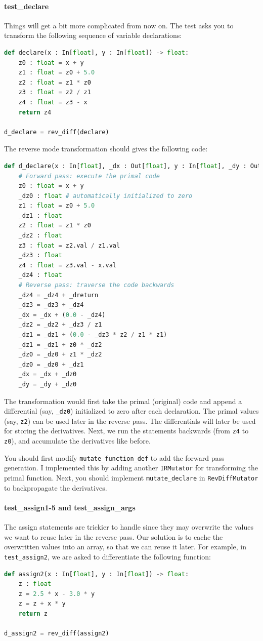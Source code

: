 \paragraph{test_declare} Things will get a bit more complicated from now on. The test asks you to transform the following sequence of variable declarations:
\begin{lstlisting}[language=Python]
def declare(x : In[float], y : In[float]) -> float:
    z0 : float = x + y
    z1 : float = z0 + 5.0
    z2 : float = z1 * z0
    z3 : float = z2 / z1
    z4 : float = z3 - x
    return z4

d_declare = rev_diff(declare)
\end{lstlisting}
The reverse mode transformation should gives the following code:
\begin{lstlisting}[language=Python]
def d_declare(x : In[float], _dx : Out[float], y : In[float], _dy : Out[float], _dreturn : In[float]):
	# Forward pass: execute the primal code
	z0 : float = x + y
	_dz0 : float # automatically initialized to zero
	z1 : float = z0 + 5.0
	_dz1 : float
	z2 : float = z1 * z0
	_dz2 : float
	z3 : float = z2.val / z1.val
	_dz3 : float
	z4 : float = z3.val - x.val
	_dz4 : float
	# Reverse pass: traverse the code backwards
	_dz4 = _dz4 + _dreturn
	_dz3 = _dz3 + _dz4
	_dx = _dx + (0.0 - _dz4)
	_dz2 = _dz2 + _dz3 / z1
	_dz1 = _dz1 + (0.0 - _dz3 * z2 / z1 * z1)
	_dz1 = _dz1 + z0 * _dz2
	_dz0 = _dz0 + z1 * _dz2
	_dz0 = _dz0 + _dz1
	_dx = _dx + _dz0
	_dy = _dy + _dz0
\end{lstlisting}

The transformation would first take the primal (original) code and append a differential (say, \lstinline{_dz0}) initialized to zero after each declaration. The primal values (say, \lstinline{z2}) can be used later in the reverse pass. The differentials will later be used for storing the derivatives. Next, we run the statements backwards (from \lstinline{z4} to \lstinline{z0}), and accumulate the derivatives like before.

You should first modify \lstinline{mutate_function_def} to add the forward pass generation. I implemented this by adding another \lstinline{IRMutator} for transforming the primal function. Next, you should implement \lstinline{mutate_declare} in \lstinline{RevDiffMutator} to backpropagate the derivatives.

\paragraph{test_assign1-5 and test_assign_args} The assign statements are trickier to handle since they may overwrite the values we want to reuse later in the reverse pass. Our solution is to cache the overwritten values into an array, so that we can reuse it later. For example, in \lstinline{test_assign2}, we are asked to differentiate the following function:
\begin{lstlisting}[language=Python]
def assign2(x : In[float], y : In[float]) -> float:
    z : float
    z = 2.5 * x - 3.0 * y
    z = z + x * y
    return z

d_assign2 = rev_diff(assign2)
\end{lstlisting}


